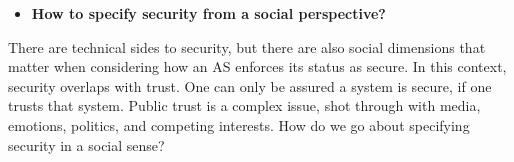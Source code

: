 \documentclass[sigconf,nonacm]{acmart}%
\begin{document}
	\begin{itemize}[leftmargin=0.5cm]
		\item \noindent\textbf{How to specify security from a social perspective?} 
	\end{itemize}
	There are technical sides to security, but there are also social dimensions that matter when considering how an AS enforces its status as secure. In this context, security overlaps with trust. One can only be assured a system is secure, if one trusts that system. Public trust is a complex issue, shot through with media, emotions, politics, and competing interests. How do we go about specifying security in a social sense? 
	
\end{document}
